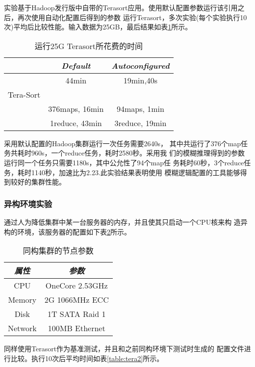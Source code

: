 实验基于Hadoop发行版中自带的Terasort应用。使用默认配置参数运行该引用之后，再次使用自动化配置后得到的参数
运行Terasort，多次实验(每个实验执行10次)平均后比较性能。输入数据为25GB，最后结果如表\ref{table:tera1}所示。

\begin{table}[h!]\small
  \caption{运行25G Terasort所花费的时间}
  \label{table:tera1}
  \centering
  \begin{tabular}{|c|c|c|}
    \hline
    & \textit{Default} & \textit{Autoconfigured}\\
    \hline
    & 44min & 19min,40s\\
    Tera-Sort & &\\
    & 376maps, 16min & 94maps, 1min\\
    & 1reduce, 43min & 3reduce, 19min\\
    \hline
  \end{tabular}
\end{table}

采用默认配置的Hadoop集群运行一次任务需要2640s，
其中共运行了376个map任务共耗时960s，一个reduce任务，耗时2580秒。采用我
们的模糊推理得到的参数运行同一个任务只需要1180s，其中公允性了94个map任
务耗时60秒，3个reduce任务，耗时1140秒，加速比为2.23.此实验结果表明使用
模糊逻辑配置的工具能够得到较好的集群性能。


\subsubsection{异构环境实验}
通过人为降低集群中某一台服务器的内存，并且使其只启动一个CPU核来构
造异构的环境，该服务器的配置如下表\ref{table:m2}所示。

\begin{table}[h!]\small
  \caption{同构集群的节点参数}
  \label{table:m2}
  \centering
  \begin{tabular}{|c|c|}
    \hline
    \textit{属性} & \textit{参数} \\
    \hline
    CPU &  OneCore  2.53GHz\\
    \hline
    Memory & 2G 1066MHz ECC\\
    \hline
    Disk & 1T SATA Raid 1\\
    \hline
    Network & 100MB Ethernet\\
    \hline
  \end{tabular}
\end{table}

同样使用Terasort作为基准测试，并且和之前同构环境下测试时生成的
配置文件进行比较。执行10次后平均时间如表\ref{table:tera2}所示。

